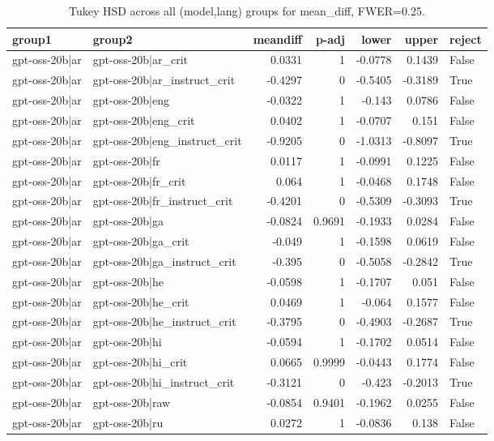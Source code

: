 \begin{table}
\caption{Tukey HSD across all (model,lang) groups for mean_diff, FWER=0.25.}
\label{tab:tukey_all_models_all_langs_mean_diff}
\begin{tabular}{l l r r r r l}
\toprule
group1 & group2 & meandiff & p-adj & lower & upper & reject \\
\midrule
gpt-oss-20b|ar & gpt-oss-20b|ar_crit & 0.0331 & 1 & -0.0778 & 0.1439 & False \\
gpt-oss-20b|ar & gpt-oss-20b|ar_instruct_crit & -0.4297 & 0 & -0.5405 & -0.3189 & True \\
gpt-oss-20b|ar & gpt-oss-20b|eng & -0.0322 & 1 & -0.143 & 0.0786 & False \\
gpt-oss-20b|ar & gpt-oss-20b|eng_crit & 0.0402 & 1 & -0.0707 & 0.151 & False \\
gpt-oss-20b|ar & gpt-oss-20b|eng_instruct_crit & -0.9205 & 0 & -1.0313 & -0.8097 & True \\
gpt-oss-20b|ar & gpt-oss-20b|fr & 0.0117 & 1 & -0.0991 & 0.1225 & False \\
gpt-oss-20b|ar & gpt-oss-20b|fr_crit & 0.064 & 1 & -0.0468 & 0.1748 & False \\
gpt-oss-20b|ar & gpt-oss-20b|fr_instruct_crit & -0.4201 & 0 & -0.5309 & -0.3093 & True \\
gpt-oss-20b|ar & gpt-oss-20b|ga & -0.0824 & 0.9691 & -0.1933 & 0.0284 & False \\
gpt-oss-20b|ar & gpt-oss-20b|ga_crit & -0.049 & 1 & -0.1598 & 0.0619 & False \\
gpt-oss-20b|ar & gpt-oss-20b|ga_instruct_crit & -0.395 & 0 & -0.5058 & -0.2842 & True \\
gpt-oss-20b|ar & gpt-oss-20b|he & -0.0598 & 1 & -0.1707 & 0.051 & False \\
gpt-oss-20b|ar & gpt-oss-20b|he_crit & 0.0469 & 1 & -0.064 & 0.1577 & False \\
gpt-oss-20b|ar & gpt-oss-20b|he_instruct_crit & -0.3795 & 0 & -0.4903 & -0.2687 & True \\
gpt-oss-20b|ar & gpt-oss-20b|hi & -0.0594 & 1 & -0.1702 & 0.0514 & False \\
gpt-oss-20b|ar & gpt-oss-20b|hi_crit & 0.0665 & 0.9999 & -0.0443 & 0.1774 & False \\
gpt-oss-20b|ar & gpt-oss-20b|hi_instruct_crit & -0.3121 & 0 & -0.423 & -0.2013 & True \\
gpt-oss-20b|ar & gpt-oss-20b|raw & -0.0854 & 0.9401 & -0.1962 & 0.0255 & False \\
gpt-oss-20b|ar & gpt-oss-20b|ru & 0.0272 & 1 & -0.0836 & 0.138 & False \\

\end{tabular}
\end{table}
